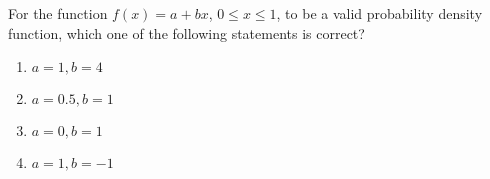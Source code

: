\item For the function \( f(x) = a + bx \), \( 0 \leq x \leq 1 \), to be a valid probability density function, which one of the following statements is correct?
    \begin{enumerate}
        \item \( a = 1, b = 4 \)
        \item \( a = 0.5, b = 1 \)
        \item \( a = 0, b = 1 \)
        \item \( a = 1, b = -1 \)
    \end{enumerate}

